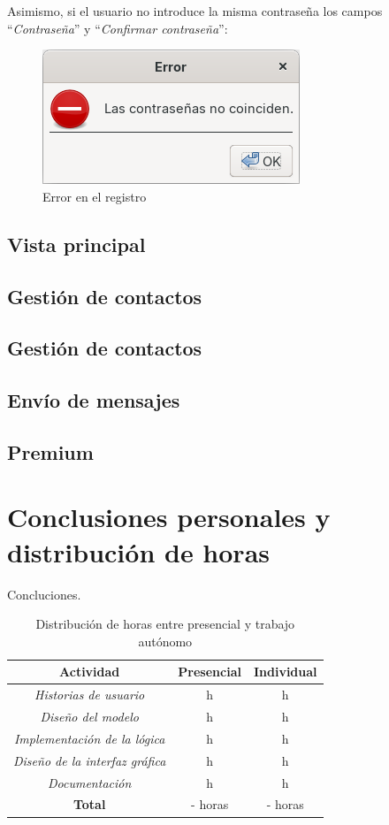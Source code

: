\documentclass[11pt]{article}
\begin{document}
Asimismo, si el usuario no introduce la misma contraseña los campos ``\textit{Contraseña}'' y ``\textit{Confirmar contraseña}'':
\begin{figure}[H]
	\centering
	\includegraphics[width=0.35\linewidth]{error-register-passwords}
	\caption{Error en el registro}
	\label{fig:error-register-passwords}
\end{figure}



\subsection{Vista principal}

\subsection{Gestión de contactos}

\subsection{Gestión de contactos}

\subsection{Envío de mensajes}

\subsection{Premium}

\clearpage

\section{Conclusiones personales y distribución de horas}
Concluciones.

\begin{table}[h!]
	\centering
	\begin{tabular}{|c|c|c|}
		\hline
		\textbf{Actividad} & \textbf{Presencial} & \textbf{Individual} \\
		\hline
		\textit{Historias de usuario} &  h &  h \\
		\hline
		\textit{Diseño del modelo} &  h &  h\\
		\hline
		\textit{Implementación de la lógica} &  h &  h\\
		\hline
		\textit{Diseño de la interfaz gráfica} &  h &  h\\
		\hline
		\textit{Documentación} &  h &  h \\
		\hline
		\textbf{Total} & - horas & - horas\\
		\hline
	\end{tabular}
	\caption{Distribución de horas entre presencial y trabajo autónomo}
\end{table}



\end{document}
